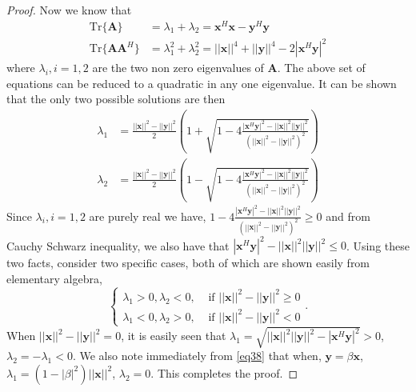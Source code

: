 \documentclass[11pt,draftclsnofoot,onecolumn]{IEEEtran}
\theoremstyle{definition}
\theoremstyle{remark}
\begin{document}
\begin{proof}
Now we know that
\begin{align*}
\mathrm{Tr}\{ \mathbf{A}\}&=\lambda_1+\lambda_2=\mathbf{x}^H\mathbf{x}-\mathbf{y}^H\mathbf{y} \\
\mathrm{Tr}\{\mathbf{AA}^H\}&=\lambda_1^2+\lambda_2^2=||\mathbf{x}||^4+||\mathbf{y}||^4-2|\mathbf{x}^H\mathbf{y}|^2
\end{align*}
where $\lambda_i,i=1,2$ are the two non zero eigenvalues of $\mathbf{A}$. The above  set of equations can be reduced to  a quadratic in any one eigenvalue. It can be shown that the only two possible solutions are then 
\begin{equation} \label{eq38}
 \begin{aligned} \lambda_1&=\frac{||\mathbf{x}||^2-||\mathbf{y}||^2}{2}
\left(  1+ \sqrt{ 1-4\frac{|\mathbf{x}^H\mathbf{y}|^2 -||\mathbf{x}||^2||\mathbf{y}||^2}{(||\mathbf{x}||^2-||\mathbf{y}||^2)^2} } \right) \\
\lambda_2&=\frac{||\mathbf{x}||^2-||\mathbf{y}||^2}{2}
\left(  1- \sqrt{ 1-4\frac{|\mathbf{x}^H\mathbf{y}|^2 -||\mathbf{x}||^2||\mathbf{y}||^2}{(||\mathbf{x}||^2-||\mathbf{y}||^2)^2} } \right) \end{aligned}
\end{equation}
Since $\lambda_i,i=1,2$ are purely real we have, $1-4\frac{|\mathbf{x}^H\mathbf{y}|^2 -||\mathbf{x}||^2||\mathbf{y}||^2}{(||\mathbf{x}||^2-||\mathbf{y}||^2)^2} \geq0$ and from Cauchy Schwarz inequality, we also have that $|\mathbf{x}^H\mathbf{y}|^2 -||\mathbf{x}||^2||\mathbf{y}||^2\leq0 $. Using these two facts, consider two specific cases, both of which are shown easily from elementary algebra, 
\begin{equation} \label{eq39}
\begin{cases}
\lambda_1>0,\lambda_2 <0, & \mbox{ if } ||\mathbf{x}||^2-||\mathbf{y}||^2 \geq0 \\
\lambda_1<0,\lambda_2>0, & \mbox{ if } ||\mathbf{x}||^2-||\mathbf{y}||^2 <0
\end{cases}.
\end{equation}
When $||\mathbf{x}||^2-||\mathbf{y}||^2=0$, it is easily seen that $\lambda_1=\sqrt{||\mathbf{x}||^2||\mathbf{y}||^2-|\mathbf{x}^H\mathbf{y}|^2 } >0$, $\lambda_2=-\lambda_1<0$. We also note immediately from \eqref{eq38} that when, $\mathbf{y}=\beta \mathbf{x}$, $\lambda_1 =(1-|\beta|^2)||\mathbf{x}||^2$, $\lambda_2=0$. This completes the proof.
\end{proof}
\end{document}

